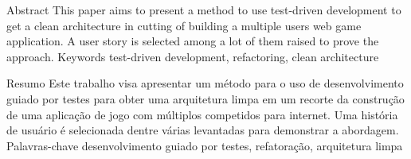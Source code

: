 \begin{singlespace}
  \resumo
    {Abstract}
    {This paper aims to present a method to use test-driven development to get a clean architecture in cutting of building a multiple users web game application. A user story is selected among a lot of them raised to prove the approach.}
    {Keywords}
    {test-driven development, refactoring, clean architecture}

  \resumo
    {Resumo}
    {Este trabalho visa apresentar um método para o uso de desenvolvimento guiado por testes para obter uma arquitetura limpa em um recorte da construção de uma aplicação de jogo com múltiplos competidos para internet. Uma história de usuário é selecionada dentre várias levantadas para demonstrar a abordagem.}
    {Palavras-chave}
    {desenvolvimento guiado por testes, refatoração, arquitetura limpa}
\end{singlespace}
